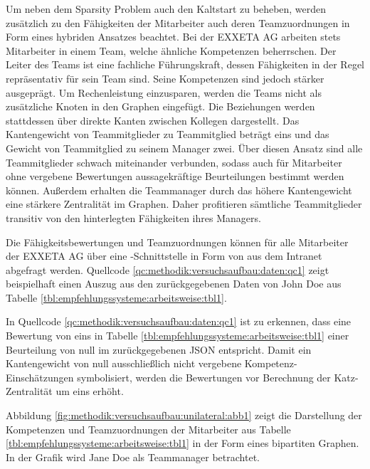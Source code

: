 Um neben dem Sparsity Problem auch den Kaltstart zu beheben, werden zusätzlich zu den Fähigkeiten der Mitarbeiter auch deren Teamzuordnungen in Form eines hybriden Ansatzes beachtet. Bei der EXXETA AG arbeiten stets Mitarbeiter in einem Team, welche ähnliche Kompetenzen beherrschen. Der Leiter des Teams ist eine fachliche Führungskraft, dessen Fähigkeiten in der Regel repräsentativ für sein Team sind. Seine Kompetenzen sind jedoch stärker ausgeprägt. Um Rechenleistung einzusparen, werden die Teams nicht als zusätzliche Knoten in den Graphen eingefügt. Die Beziehungen werden stattdessen über direkte Kanten zwischen Kollegen dargestellt. Das Kantengewicht von Teammitglieder zu Teammitglied beträgt eins und das Gewicht von Teammitglied zu seinem Manager zwei. Über diesen Ansatz sind alle Teammitglieder schwach miteinander verbunden, sodass auch für Mitarbeiter ohne vergebene Bewertungen aussagekräftige Beurteilungen bestimmt werden können. Außerdem erhalten die Teammanager durch das höhere Kantengewicht eine stärkere Zentralität im Graphen.  Daher profitieren sämtliche Teammitglieder transitiv von den hinterlegten Fähigkeiten ihres Managers.

Die Fähigkeitsbewertungen und Teamzuordnungen können für alle Mitarbeiter der EXXETA AG über eine -Schnittstelle in Form von  aus dem Intranet abgefragt werden. Quellcode \ref{qc:methodik:versuchsaufbau:daten:qc1} zeigt beispielhaft einen Auszug aus den zurückgegebenen Daten von John Doe aus Tabelle \ref{tbl:empfehlungssysteme:arbeitsweise:tbl1}.

\begin{minipage}{\linewidth}
	
\end{minipage}

In Quellcode \ref{qc:methodik:versuchsaufbau:daten:qc1} ist zu erkennen, dass eine Bewertung von eins in Tabelle \ref{tbl:empfehlungssysteme:arbeitsweise:tbl1} einer Beurteilung von null im zurückgegebenen \ac{JSON} entspricht. Damit ein Kantengewicht von null ausschließlich nicht vergebene Kompetenz-Einschätzungen symbolisiert, werden die Bewertungen vor Berechnung der Katz-Zentralität um eins erhöht.

Abbildung \ref{fig:methodik:versuchsaufbau:unilateral:abb1} zeigt die Darstellung der Kompetenzen und Teamzuordnungen der Mitarbeiter aus Tabelle \ref{tbl:empfehlungssysteme:arbeitsweise:tbl1} in der Form eines bipartiten Graphen. In der Grafik wird Jane Doe als Teammanager betrachtet.

